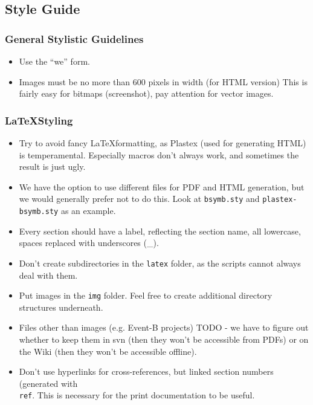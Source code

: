 \subsection{Style Guide}


\subsubsection{General Stylistic Guidelines}

\begin{itemize}
	\item Use the ``we'' form.
	\item Images must be no more than 600 pixels in width (for HTML version)  This is fairly easy for bitmaps (screenshot), pay attention for vector images.
\end{itemize}

\subsubsection{\LaTeX Styling}

\begin{itemize}
	\item Try to avoid fancy \LaTeX formatting, as Plastex (used for generating HTML) is temperamental.  Especially macros don't always work, and sometimes the result is just ugly.
	\item We have the option to use different files for PDF and HTML generation, but we would generally prefer not to do this.  Look at \texttt{bsymb.sty} and \texttt{plastex-bsymb.sty} as an example.
	\item Every section should have a label, reflecting the section name, all lowercase, spaces replaced with underscores (\_).
	\item Don't create subdirectories in the \texttt{latex} folder, as the scripts cannot always deal with them.
	\item Put images in the \texttt{img} folder.  Feel free to create additional directory structures underneath.
	\item Files other than images (e.g. Event-B projects) TODO - we have to figure out whether to keep them in svn (then they won't be accessible from PDFs) or on the Wiki (then they won't be accessible offline).
	\item Don't use hyperlinks for cross-references, but linked section numbers (generated with \texttt{\\ref{}}.  This is necessary for the print documentation to be useful.
\end{itemize}

